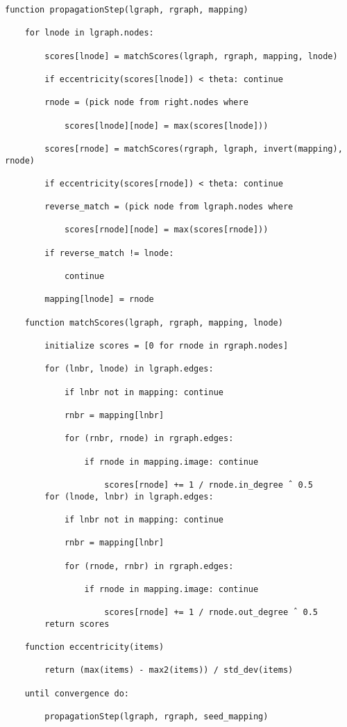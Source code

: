 \documentclass[preprint,12pt]{elsarticle}
\theoremstyle{definition}
\theoremstyle{remark}
\begin{document}
\begin{verbatim}
function propagationStep(lgraph, rgraph, mapping)

	for lnode in lgraph.nodes:
		
        scores[lnode] = matchScores(lgraph, rgraph, mapping, lnode)
		
        if eccentricity(scores[lnode]) < theta: continue
		
        rnode = (pick node from right.nodes where
		
        	scores[lnode][node] = max(scores[lnode]))

		scores[rnode] = matchScores(rgraph, lgraph, invert(mapping), rnode)
		
        if eccentricity(scores[rnode]) < theta: continue
		
        reverse_match = (pick node from lgraph.nodes where
		
        	scores[rnode][node] = max(scores[rnode]))
		
        if reverse_match != lnode:
		
        	continue

		mapping[lnode] = rnode

	function matchScores(lgraph, rgraph, mapping, lnode)
		
        initialize scores = [0 for rnode in rgraph.nodes]
		
        for (lnbr, lnode) in lgraph.edges:
		
        	if lnbr not in mapping: continue
			
            rnbr = mapping[lnbr]
			
            for (rnbr, rnode) in rgraph.edges:
			
            	if rnode in mapping.image: continue
				
                	scores[rnode] += 1 / rnode.in_degree ˆ 0.5
		for (lnode, lnbr) in lgraph.edges:
			
            if lnbr not in mapping: continue
			
            rnbr = mapping[lnbr]
			
            for (rnode, rnbr) in rgraph.edges:
			
            	if rnode in mapping.image: continue
				
                	scores[rnode] += 1 / rnode.out_degree ˆ 0.5
		return scores
	
    function eccentricity(items)
		
        return (max(items) - max2(items)) / std_dev(items)

	until convergence do:
		
        propagationStep(lgraph, rgraph, seed_mapping)
\end{verbatim}
\pagebreak
\end{document}
